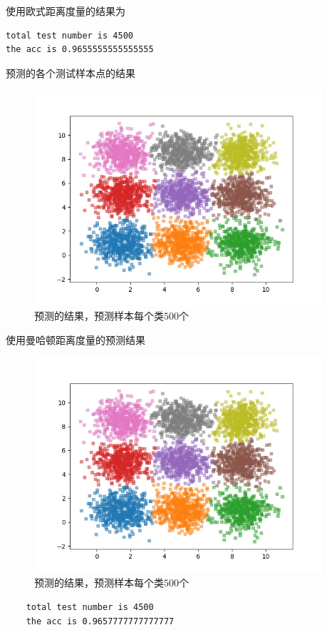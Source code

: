 \documentclass{article}
\begin{document}
使用欧式距离度量的结果为
\begin{verbatim}
total test number is 4500
the acc is 0.9655555555555555
\end{verbatim}
预测的各个测试样本点的结果
\begin{figure}[H]
    \centering
    \begin{minipage}[t]{1.0\linewidth}
        \centering
        \includegraphics[height=8cm]{normal_pred.png}
        \caption{预测的结果，预测样本每个类$500$个}
    \end{minipage}
 \end{figure}
 使用曼哈顿距离度量的预测结果
 \begin{figure}[H]
    \centering
    \begin{minipage}[t]{1.0\linewidth}
        \centering
        \includegraphics[height=8cm]{normal_man.png}
        \caption{预测的结果，预测样本每个类$500$个}
    \end{minipage}
 \end{figure}
 \begin{verbatim}
    total test number is 4500
    the acc is 0.9657777777777777
    \end{verbatim}
\end{document}

